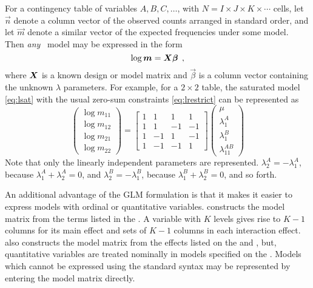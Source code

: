 For a contingency table of variables $A,B,C,\ldots $, with $N=I\times
J\times K\times \cdots $ cells, let $\vec{n}$ denote a column vector of
the observed counts arranged in standard order, and let $\vec{m}$ denote
a similar vector of the expected frequencies under some model. Then \emph{any}
\loglin\ model may be expressed
in the form
\begin{equation*}
 \log \bm{m} = \bm{X}\bm{\beta}
 \:\: ,
\end{equation*}
where $\bm{X}$ is a known design or model matrix and $\vec{\beta }$ is a
column vector containing the unknown $\lambda $ parameters. For example, for
a $2\times 2$ table, the saturated model \eqref{eq:lsat} with the usual zero-sum constraints \eqref{eq:lrestrict}
can be represented as
\begin{equation*}
\left(
\begin{array}{c}
\log m_{11} \\
\log m_{12} \\
\log m_{21} \\
\log m_{22}
\end{array}
\right) =\left[
\begin{array}{rrrr}
1 & 1 & 1 & 1 \\
1 & 1 & -1 & -1 \\
1 & -1 & 1 & -1 \\
1 & -1 & -1 & 1
\end{array}
\right] \left(
\begin{array}{c}
\mu  \\
\lambda _1^A \\
\lambda _1^B \\
\lambda _{11}^{AB}
\end{array}
\right)
\end{equation*}
Note that only the linearly independent parameters are represented.
$\lambda_2^A = - \lambda_1^A$, because $\lambda_1^A + \lambda_2^A =0$, and
$\lambda_2^B = - \lambda_1^B$, because $\lambda_1^B + \lambda_2^B =0$,
and so forth.

An additional advantage of the GLM formulation is that it makes it easier
to express models with ordinal or quantitative variables.  
constructs the model matrix from the terms listed in the .
A  variable with $K$ levels gives rise to $K-1$ columns
for its main effect and sets of $K-1$ columns in each interaction effect.
 also constructs the model matrix from the effects listed
on the  and ,
but, quantitative variables are treated nominally in models
specified on the .
Models which cannot be expressed using the standard syntax may be
represented by entering the model matrix directly.

